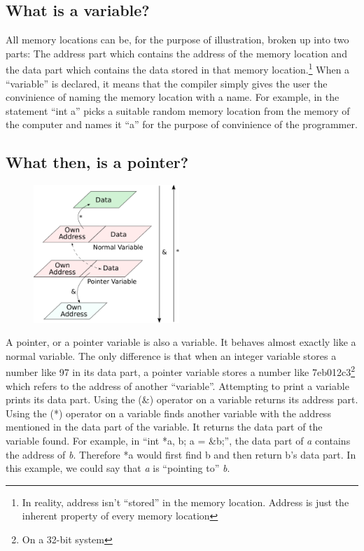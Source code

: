 \documentclass[10pt,twoside]{article}
\begin{document}
\subsection*{What is a variable?}
All memory locations can be, for the purpose of illustration, broken up into two
parts: The address part which contains the address of the memory location and
the data part which contains the data stored in that memory
location.\footnote{In reality, address isn't ``stored'' in the memory location.
Address is just the inherent property of every memory location} When a
``variable'' is declared, it means that the compiler simply gives the user the
convinience of naming the memory location with a name. For example, in the
statement ``int a'' picks a suitable random memory location from the memory of
the computer and names it ``a'' for the purpose of convinience of the
programmer.  \newpage \subsection*{What then, is a pointer?}

\begin{figure}
\includegraphics[width=55mm]{res/variable-pointer.pdf}
\end{figure}

A pointer, or a pointer variable is also a variable. It behaves almost exactly
like a normal variable. The only difference is that when an integer variable
stores a number like 97 in its data part, a pointer variable stores a number
like 7eb012c3\footnote{On a 32-bit system} which refers to the address of
another ``variable''. Attempting to print a variable prints its data part. Using
the (\&) operator on a variable returns its address part. Using the (*) operator
on a variable finds another variable with the address mentioned in the data part
of the variable.  It returns the data part of the variable found. For example,
in ``int *a, b; a = \&b;'', the data part of \textit{a} contains the address of
\textit{b}. Therefore *a would first find b and then return b's data part. In
this example, we could say that \textit{a} is ``pointing to'' \textit{b}.
\end{document}
